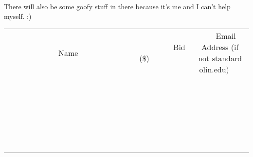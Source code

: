 \documentclass[11pt]{article}
\begin{document}
There will also be some goofy stuff in there because it's me and I can't help myself. :)
\\[6ex]
\begin{tabular}{c c c}
~~~~~~~~~~~~~Name~~~~~~~~~~~~~ & ~~~~~~~~~Bid (\$)~~~~~~~~~  & ~~~Email Address (if not standard olin.edu)~~~\\
 & & \\
\hline
 & & \\
\hline
 & & \\
\hline
 & & \\
\hline
 & & \\
\hline
 & & \\
\hline
 & & \\
\hline
 & & \\
\hline
 & & \\
\hline
 & & \\
\hline
 & & \\
\hline
 & & \\
\hline
 & & \\
\hline
 & & \\
\hline
 & & \\
\hline
 & & \\
\hline
 & & \\
\hline
 & & \\
\hline
 & & \\
\hline
 & & \\
\hline
 & & \\
\hline
 & & \\
\hline
 & & \\
\hline
 & & \\
\hline
 & & \\
\hline
 & & \\
\hline
\end{tabular}
\newpage
\end{document}

